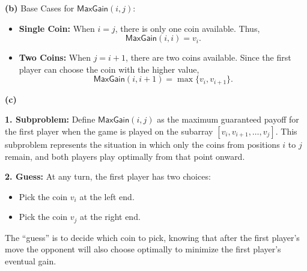 \documentclass[11pt]{article}
\begin{document}
        \textbf{(b)} Base Cases for \(\mathsf{MaxGain}(i,j)\):
        \begin{itemize}
            \item \textbf{Single Coin:} When \(i = j\), there is only one coin available. Thus,
            \[
            \mathsf{MaxGain}(i,i) = v_i.
            \]
            \item \textbf{Two Coins:} When \(j = i+1\), there are two coins available. Since the first player can choose the coin with the higher value,
            \[
            \mathsf{MaxGain}(i,i+1) = \max\{v_i, v_{i+1}\}.
            \]
        \end{itemize}
        
        \bigskip
        
        \textbf{(c)}
        
        \textbf{1. Subproblem:}  
        Define \(\mathsf{MaxGain}(i,j)\) as the maximum guaranteed payoff for the first player when the game is played on the subarray \([v_i, v_{i+1}, \dots, v_j]\). This subproblem represents the situation in which only the coins from positions \(i\) to \(j\) remain, and both players play optimally from that point onward.
        
        \bigskip
        
        \textbf{2. Guess:}  
        At any turn, the first player has two choices:  
        \begin{itemize}
            \item Pick the coin \(v_i\) at the left end.
            \item Pick the coin \(v_j\) at the right end.
        \end{itemize}
        The “guess” is to decide which coin to pick, knowing that after the first player's move the opponent will also choose optimally to minimize the first player's eventual gain.
        
        \bigskip
        
\end{document}
